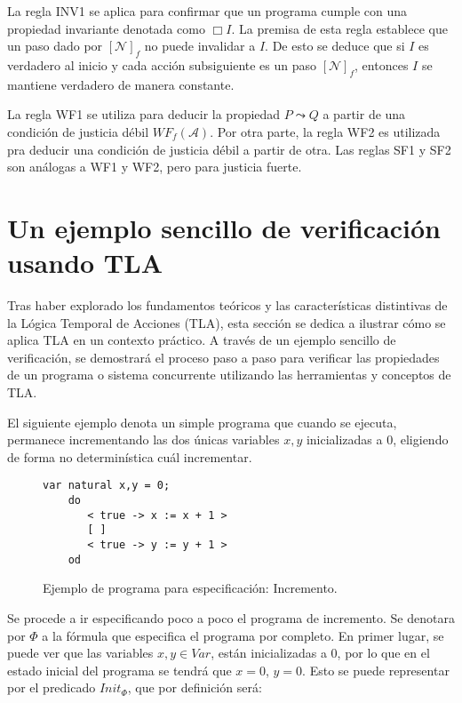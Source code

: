 La regla INV1 se aplica para confirmar que un programa cumple con una propiedad invariante denotada como $\Box I$. La premisa de esta regla establece que un paso dado por $[\mathcal{N}]_f$ no puede invalidar a $I$. De esto se deduce que si $I$ es verdadero al inicio y cada acción subsiguiente es un paso $[\mathcal{N}]_f$, entonces $I$ se mantiene verdadero de manera constante.

La regla WF1 se utiliza para deducir la propiedad $P \leadsto Q$ a partir de una condición de justicia débil $WF_f(\mathcal{A})$. Por otra parte, la regla WF2 es utilizada pra deducir una condición de justicia débil a partir de otra. Las reglas SF1 y SF2 son análogas a WF1 y WF2, pero para justicia fuerte.

\section{Un ejemplo sencillo de verificación usando TLA}\label{section:TLAexample}
Tras haber explorado los fundamentos teóricos y las características distintivas de la Lógica Temporal de Acciones (TLA), esta sección se dedica a ilustrar cómo se aplica TLA en un contexto práctico. A través de un ejemplo sencillo de verificación, se demostrará el proceso paso a paso para verificar las propiedades de un programa o sistema concurrente utilizando las herramientas y conceptos de TLA.

El siguiente ejemplo denota un simple programa que cuando se ejecuta, permanece incrementando las dos únicas variables $x,y$ inicializadas a 0, eligiendo de forma no determinística cuál incrementar.

\begin{figure}[ht]
\centering
\begin{lstlisting}[basicstyle=\ttfamily\small, frame=single]
    var natural x,y = 0;
    do 
       < true -> x := x + 1 >
       [ ]
       < true -> y := y + 1 >
    od
\end{lstlisting}
\caption{Ejemplo de programa para especificación: Incremento.}
\label{fig:TLAincrement}
\end{figure}

Se procede a ir especificando poco a poco el programa de incremento. Se denotara por $\Phi$ a la fórmula que especifica el programa por completo. En primer lugar, se puede ver que las variables $x,y \in Var$, están inicializadas a $0$, por lo que en el estado inicial del programa se tendrá que $x = 0$, $y = 0$. Esto se puede representar por el predicado $Init_{\Phi}$, que por definición será:

